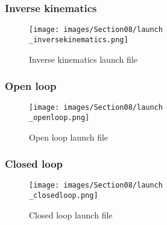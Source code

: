\subsubsection{Inverse kinematics}
\begin{figure}[ht]
    \centering
    \texttt{[image: images/Section08/launch\\\_inversekinematics.png]}
    \caption{Inverse kinematics launch file}
    \label{fig:mesh22}
\end{figure}
\FloatBarrier

\subsubsection{Open loop}
\begin{figure}[ht]
    \centering
    \texttt{[image: images/Section08/launch\\\_openloop.png]}
    \caption{Open loop launch file}
    \label{fig:mesh23}
\end{figure}
\FloatBarrier

\subsubsection{Closed loop}
\begin{figure}[ht]
    \centering
    \texttt{[image: images/Section08/launch\\\_closedloop.png]}
    \caption{Closed loop launch file}
    \label{fig:mesh24}
\end{figure}
\FloatBarrier
